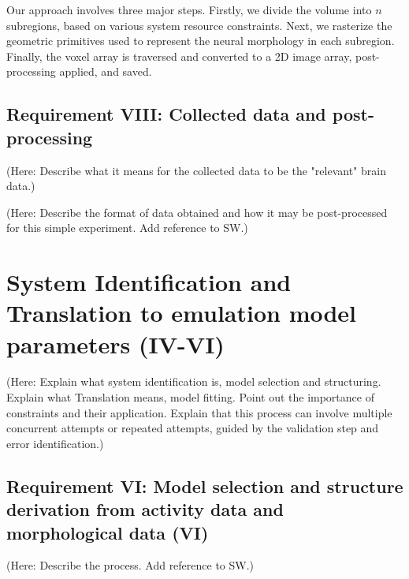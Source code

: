 \documentclass{ldr-article}
\begin{document}
Our approach involves three major steps. Firstly, we divide the volume into $n$ subregions, based on various system resource constraints. Next, we rasterize the geometric primitives used to represent the neural morphology in each subregion. Finally, the voxel array is traversed and converted to a 2D image array, post-processing applied, and saved.




\subsection{Requirement VIII: Collected data and post-processing}

(Here: Describe what it means for the collected data to be the "relevant" brain data.)

(Here: Describe the format of data obtained and how it may be post-processed for this simple experiment. Add reference to SW.)

\section{System Identification and Translation to emulation model parameters (IV-VI)}

(Here: Explain what system identification is, model selection and structuring. Explain what Translation means, model fitting. Point out the importance of constraints and their application. Explain that this process can involve multiple concurrent attempts or repeated attempts, guided by the validation step and error identification.)

\subsection{Requirement VI: Model selection and structure derivation from activity data and morphological data (VI)}

(Here: Describe the process. Add reference to SW.)
\end{document}
